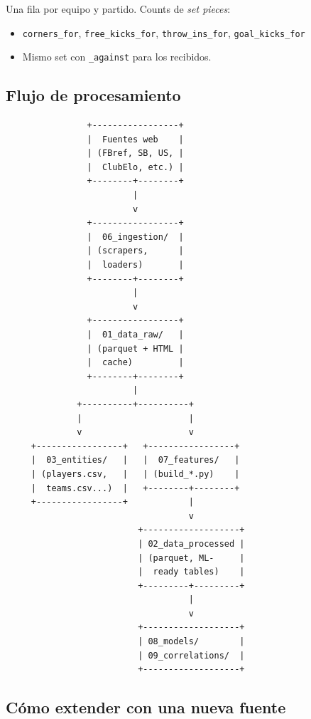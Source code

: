 Una fila por equipo y partido. Counts de \emph{set pieces}:
\begin{itemize}[noitemsep]
  \item \texttt{corners\_for}, \texttt{free\_kicks\_for}, \texttt{throw\_ins\_for}, \texttt{goal\_kicks\_for}
  \item Mismo set con \texttt{\_against} para los recibidos.
\end{itemize}

\subsection{Flujo de procesamiento}

\begin{verbatim}
                +-----------------+
                |  Fuentes web    |
                | (FBref, SB, US, |
                |  ClubElo, etc.) |
                +--------+--------+
                         |
                         v
                +-----------------+
                |  06_ingestion/  |
                | (scrapers,      |
                |  loaders)       |
                +--------+--------+
                         |
                         v
                +-----------------+
                |  01_data_raw/   |
                | (parquet + HTML |
                |  cache)         |
                +--------+--------+
                         |
              +----------+----------+
              |                     |
              v                     v
     +-----------------+   +-----------------+
     |  03_entities/   |   |  07_features/   |
     | (players.csv,   |   | (build_*.py)    |
     |  teams.csv...)  |   +--------+--------+
     +-----------------+            |
                                    v
                          +-------------------+
                          | 02_data_processed |
                          | (parquet, ML-     |
                          |  ready tables)    |
                          +---------+---------+
                                    |
                                    v
                          +-------------------+
                          | 08_models/        |
                          | 09_correlations/  |
                          +-------------------+
\end{verbatim}

\subsection{Cómo extender con una nueva fuente}

